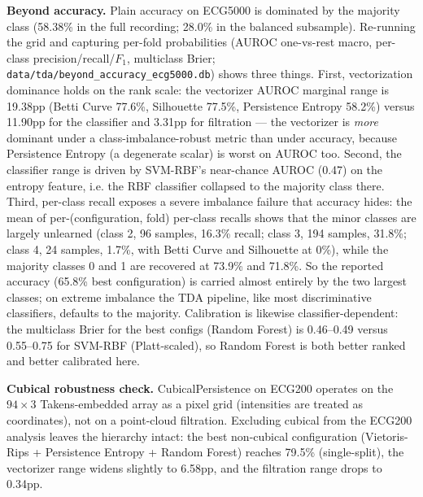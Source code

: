 \documentclass[12pt, a4paper]{report}
\theoremstyle{definition}
\theoremstyle{plain}
\theoremstyle{remark}
\begin{document}
\textbf{Beyond accuracy.} Plain accuracy on ECG5000 is dominated by
the majority class (58.38\% in the full recording; 28.0\% in the
balanced subsample). Re-running the grid and capturing per-fold
probabilities (AUROC one-vs-rest macro, per-class
precision/recall/$F_1$, multiclass Brier;
\texttt{data/tda/beyond\_accuracy\_ecg5000.db}) shows three things.
First, vectorization dominance holds on the rank scale: the vectorizer
AUROC marginal range is 19.38pp (Betti Curve 77.6\%, Silhouette 77.5\%,
Persistence Entropy 58.2\%) versus 11.90pp for the classifier and
3.31pp for filtration --- the vectorizer is \emph{more} dominant
under a class-imbalance-robust metric than under accuracy, because
Persistence Entropy (a degenerate scalar) is worst on AUROC too.
Second, the classifier range is driven by SVM-RBF's near-chance AUROC
(0.47) on the entropy feature, i.e. the RBF classifier collapsed to the
majority class there. Third, per-class recall exposes a severe
imbalance failure that accuracy hides: the mean of
per-(configuration, fold) per-class recalls shows that the minor classes are largely
unlearned (class 2, 96 samples, 16.3\% recall; class 3, 194 samples,
31.8\%; class 4, 24 samples, 1.7\%, with Betti Curve and Silhouette at
0\%), while the majority classes 0 and 1 are recovered at 73.9\% and
71.8\%. So the reported accuracy (65.8\% best configuration) is
carried almost entirely by the two largest classes; on extreme
imbalance the TDA pipeline, like most discriminative classifiers,
defaults to the majority. Calibration is likewise classifier-dependent:
the multiclass Brier for the best configs (Random Forest) is 0.46--0.49
versus 0.55--0.75 for SVM-RBF (Platt-scaled), so Random Forest is both
better ranked and better calibrated here.

\textbf{Cubical robustness check.} CubicalPersistence on ECG200
operates on the $94 \times 3$ Takens-embedded array as a pixel grid
(intensities are treated as coordinates), not on a point-cloud
filtration. Excluding cubical from the ECG200 analysis leaves the
hierarchy intact: the best non-cubical configuration
(Vietoris-Rips + Persistence Entropy + Random Forest) reaches 79.5\% (single-split),
the vectorizer range widens slightly to 6.58pp, and the filtration
range drops to 0.34pp.
\end{document}
